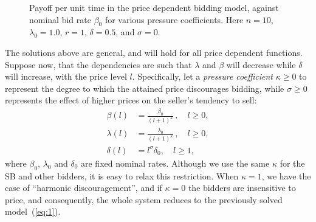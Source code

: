 \documentclass{article}
\begin{document}
\begin{figure}
\centering
\caption{Payoff per unit time in the price dependent bidding
model, against nominal bid rate $\beta_0$ for various pressure
coefficients. Here $n=10$, $\lambda_0=1.0$, $r=1$, $\delta=0.5$,
and $\sigma=0$.}\label{fig:PriceDependentBid}
\end{figure}

The solutions above are general, and will hold for all price
dependent functions. Suppose now, that the dependencies are such
that $\lambda$ and $\beta$ will decrease while $\delta$ will
increase, with the price level $l$. Specifically, let a {\em
pressure coefficient} $\kappa\geq 0$ \cite{hillier64} to represent
the degree to which the attained price discourages bidding, while
$\sigma\geq 0$ represents the effect of higher prices on the
seller's tendency to sell:
\begin{align} \label{eq:PriceDependentBidding_Functions}
\beta(l) &= \frac {\beta_0}{(l+1)^{\kappa} } \,, \quad l \geq 0 , \\
\lambda(l) &= \frac{\lambda_0}{(l+1)^{\kappa}} \,, \quad l \geq 0
,\nonumber \\
\delta(l) &= l^\sigma\delta_0 , \quad l \geq 1 ,\nonumber
\end{align}
where $\beta_0$, $\lambda_0$ and $\delta_0$ are fixed nominal
rates. Although we use the same $\kappa$ for the SB and other
bidders, it is easy to relax this restriction. When $\kappa=1$, we
have the case of ``harmonic discouragement'', and if $\kappa=0$
the bidders are insensitive to price, and consequently, the whole
system reduces to the previously solved model~(\ref{eq:1}).
\end{document}
